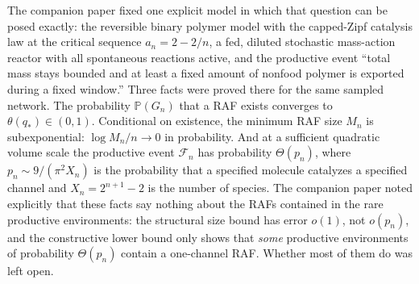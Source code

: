 \documentclass[11pt,letterpaper]{article}
\theoremstyle{plain}
\theoremstyle{definition}
\theoremstyle{remark}
\numberwithin{equation}{section}
\newcommand{\PP}{\mathbb P}
\newcommand{\cF}{\mathcal F}
\newcommand{\thetaq}{\theta(q_*)}
\begin{document}
The companion paper \cite{companion2026} fixed one explicit model in which that question can be posed exactly: the reversible binary polymer model with the capped-Zipf catalysis law at the critical sequence $a_n=2-2/n$, a fed, diluted stochastic mass-action reactor with all spontaneous reactions active, and the productive event ``total mass stays bounded and at least a fixed amount of nonfood polymer is exported during a fixed window.'' Three facts were proved there for the same sampled network. The probability $\PP(G_n)$ that a RAF exists converges to $\thetaq\in(0,1)$. Conditional on existence, the minimum RAF size $M_n$ is subexponential: $\log M_n/n\to0$ in probability. And at a sufficient quadratic volume scale the productive event $\cF_n$ has probability $\Theta(p_n)$, where $p_n\sim9/(\pi^2X_n)$ is the probability that a specified molecule catalyzes a specified channel and $X_n=2^{n+1}-2$ is the number of species. The companion paper noted explicitly that these facts say nothing about the RAFs contained in the rare productive environments: the structural size bound has error $o(1)$, not $o(p_n)$, and the constructive lower bound only shows that \emph{some} productive environments of probability $\Theta(p_n)$ contain a one-channel RAF. Whether most of them do was left open.
\end{document}
